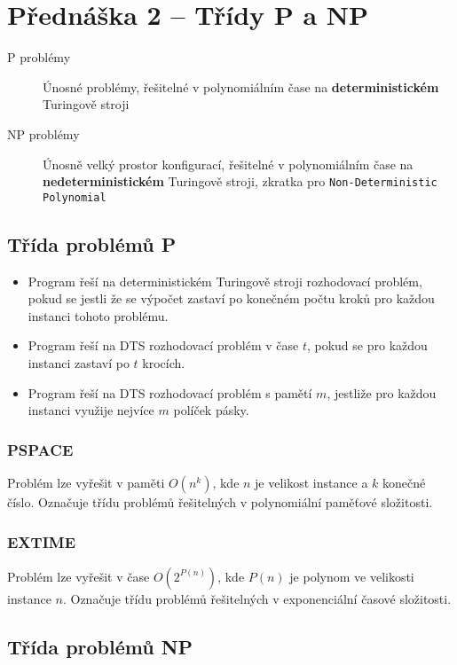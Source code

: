 \section{Přednáška 2 -- Třídy P a NP}

\begin{description}
    \item[P problémy] Únosné problémy, řešitelné v polynomiálním čase na \textbf{deterministickém} Turingově stroji
    \item[NP problémy] Únosně velký prostor konfigurací, řešitelné v polynomiálním čase na \textbf{nedeterministickém} Turingově stroji, zkratka pro \texttt{Non-Deterministic Polynomial}
\end{description}

\subsection{Třída problémů P}

\begin{itemize}
    \item Program řeší na deterministickém Turingově stroji rozhodovací problém, pokud se jestli že se výpočet zastaví po konečném počtu kroků pro každou instanci tohoto problému.
    \item Program řeší na DTS rozhodovací problém v čase $t$, pokud se pro každou instanci zastaví po $t$ krocích.
    \item Program řeší na DTS rozhodovací problém s pamětí $m$, jestliže pro každou instanci využije nejvíce $m$ políček pásky.
\end{itemize}

\subsubsection*{PSPACE}
Problém lze vyřešit v paměti $O(n^k)$, kde $n$ je velikost instance a $k$ konečné číslo.
Označuje třídu problémů řešitelných v polynomiální paměťové složitosti.

\subsubsection*{EXTIME}
Problém lze vyřešit v čase $O(2^{P(n)})$, kde $P(n)$ je polynom ve velikosti instance $n$.
Označuje třídu problémů řešitelných v exponenciální časové složitosti.

\subsection{Třída problémů NP}


